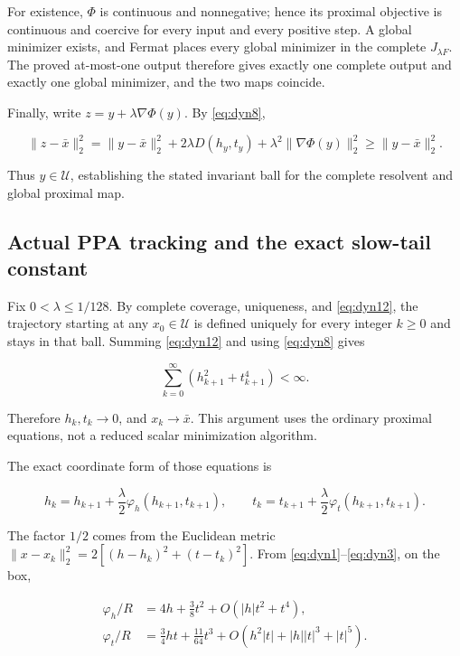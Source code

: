 \documentclass[11pt]{article}
\theoremstyle{remark}\newtheorem{remark}[theorem]{Remark}
\begin{document}
For existence, \(\Phi\) is continuous and nonnegative; hence its proximal objective is continuous and coercive for every input and every positive step. A global minimizer exists, and Fermat places every global minimizer in the complete \(J_{\lambda F}\). The proved at-most-one output therefore gives exactly one complete output and exactly one global minimizer, and the two maps coincide.

Finally, write \(z=y+\lambda\nabla\Phi(y)\). By \eqref{eq:dyn8},

\begin{equation}
\|z-\bar x\|_2^2
=\|y-\bar x\|_2^2+2\lambda D(h_y,t_y)
+\lambda^2\|\nabla\Phi(y)\|_2^2
\ge\|y-\bar x\|_2^2. \label{eq:dyn12}
\end{equation}

Thus \(y\in\mathcal U\), establishing the stated invariant ball for the complete resolvent and global proximal map.

\subsection{Actual PPA tracking and the exact slow-tail constant}

Fix \(0<\lambda\le1/128\). By complete coverage, uniqueness, and \eqref{eq:dyn12}, the trajectory starting at any \(x_0\in\mathcal U\) is defined uniquely for every integer \(k\ge0\) and stays in that ball. Summing \eqref{eq:dyn12} and using \eqref{eq:dyn8} gives

\[
\sum_{k=0}^{\infty}(h_{k+1}^2+t_{k+1}^4)<\infty.
\]

Therefore \(h_k,t_k\to0\), and \(x_k\to\bar x\). This argument uses the ordinary proximal equations, not a reduced scalar minimization algorithm.

The exact coordinate form of those equations is

\begin{equation}
h_k=h_{k+1}+\frac\lambda2\varphi_h(h_{k+1},t_{k+1}),\qquad
t_k=t_{k+1}+\frac\lambda2\varphi_t(h_{k+1},t_{k+1}). \label{eq:dyn13}
\end{equation}

The factor \(1/2\) comes from the Euclidean metric
\(\|x-x_k\|_2^2=2[(h-h_k)^2+(t-t_k)^2]\).
From \eqref{eq:dyn1}--\eqref{eq:dyn3}, on the box,

\begin{equation}
\begin{aligned}
\varphi_h/R&=4h+\tfrac38t^2+O(|h|t^2+t^4),\\
\varphi_t/R&=\tfrac34ht+\tfrac{11}{64}t^3
 +O(h^2|t|+|h||t|^3+|t|^5). \end{aligned}
\label{eq:dyn14}
\end{equation}
\end{document}
